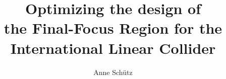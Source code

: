 \documentclass[english,draft]{sdqthesis}
\author{Anne Schütz}
\title{\LARGE Optimizing the design of\\the Final-Focus Region for the\\International Linear Collider}
\begin{document}
\setpdf

\maketitle
	
\frontmatter


\end{document}
